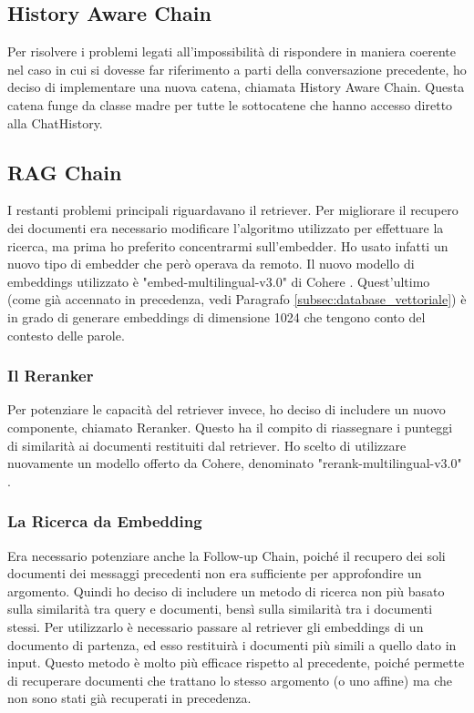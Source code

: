 \subsection{History Aware Chain}
Per risolvere i problemi legati all'impossibilità di rispondere in maniera coerente nel caso in cui si dovesse far riferimento a parti della conversazione precedente, ho deciso di implementare una nuova catena, chiamata History Aware Chain. Questa catena funge da classe madre per tutte le sottocatene che hanno accesso diretto alla ChatHistory.

\subsection{RAG Chain}
I restanti problemi principali riguardavano il retriever. Per migliorare il recupero dei documenti era necessario modificare l'algoritmo utilizzato per effettuare la ricerca, ma prima ho preferito concentrarmi sull'embedder. Ho usato infatti un nuovo tipo di embedder che però operava da remoto. Il nuovo modello di embeddings utilizzato è "embed-multilingual-v3.0" di Cohere \cite{cohereembed}. Quest'ultimo (come già accennato in precedenza, vedi Paragrafo \ref{subsec:database_vettoriale}) è in grado di generare embeddings di dimensione 1024 che tengono conto del contesto delle parole.

\subsubsection{Il Reranker}
Per potenziare le capacità del retriever invece, ho deciso di includere un nuovo componente, chiamato Reranker. Questo ha il compito di riassegnare i punteggi di similarità ai documenti restituiti dal retriever. Ho scelto di utilizzare nuovamente un modello offerto da Cohere, denominato "rerank-multilingual-v3.0" \cite{coherererank}.

\subsubsection{La Ricerca da Embedding}
Era necessario potenziare anche la Follow-up Chain, poiché il recupero dei soli documenti dei messaggi precedenti non era sufficiente per approfondire un argomento. Quindi ho deciso di includere un metodo di ricerca non più basato sulla similarità tra query e documenti, bensì sulla similarità tra i documenti stessi. Per utilizzarlo è necessario passare al retriever gli embeddings di un documento di partenza, ed esso restituirà i documenti più simili a quello dato in input. Questo metodo è molto più efficace rispetto al precedente, poiché permette di recuperare documenti che trattano lo stesso argomento (o uno affine) ma che non sono stati già recuperati in precedenza.

